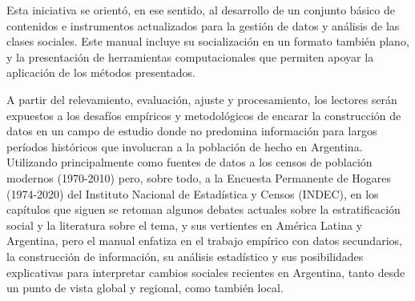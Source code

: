 \documentclass[
]{article}
\begin{document}
Esta iniciativa se orientó, en ese sentido, al desarrollo de un conjunto básico de contenidos e instrumentos actualizados para la gestión de datos y análisis de las clases sociales. Este manual incluye su socialización en un formato también plano, y la presentación de herramientas computacionales que permiten apoyar la aplicación de los métodos presentados.

A partir del relevamiento, evaluación, ajuste y procesamiento, los lectores serán expuestos a los desafíos empíricos y metodológicos de encarar la construcción de datos en un campo de estudio donde no predomina información para largos períodos históricos que involucran a la población de hecho en Argentina. Utilizando principalmente como fuentes de datos a los censos de población modernos (1970-2010) pero, sobre todo, a la Encuesta Permanente de Hogares (1974-2020) del Instituto Nacional de Estadística y Censos (INDEC), en los capítulos que siguen se retoman algunos debates actuales sobre la estratificación social y la literatura sobre el tema, y sus vertientes en América Latina y Argentina, pero el manual enfatiza en el trabajo empírico con datos secundarios, la construcción de información, su análisis estadístico y sus posibilidades explicativas para interpretar cambios sociales recientes en Argentina, tanto desde un punto de vista global y regional, como también local.
\end{document}
